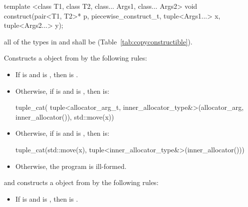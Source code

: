 %
\begin{itemdecl}
template <class T1, class T2, class... Args1, class... Args2>
  void construct(pair<T1, T2>* p, piecewise_construct_t,
                 tuple<Args1...> x, tuple<Args2...> y);
\end{itemdecl}

\begin{itemdescr}
\pnum
\requires all of the types in  and  shall be
 (Table~\ref{tab:copyconstructible}).

\pnum
\effects Constructs a  object  from  by the
following rules:
\begin{itemize}
\item If  is  and
 is ,
then  is .

\item Otherwise, if  is 
and
is
, then  is:
\begin{codeblock}
tuple_cat(
    tuple<allocator_arg_t, inner_allocator_type&>(allocator_arg, inner_allocator()),
    std::move(x))
\end{codeblock}

\item Otherwise, if  is
 and
 is ,
then  is:
\begin{codeblock}
tuple_cat(std::move(x), tuple<inner_allocator_type&>(inner_allocator()))
\end{codeblock}

\item Otherwise, the program is ill-formed.
\end{itemize}
and constructs a  object  from  by the following rules:
\begin{itemize}
\item If  is  and
 is , then  is .


\end{itemize}
\end{itemdescr}
